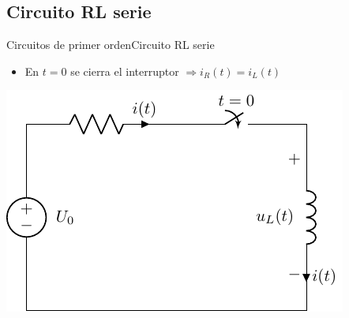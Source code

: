 \documentclass[aspectratio=169, xcolor={usenames,svgnames,dvipsnames}]{beamer}
\begin{document}
\subsection{Circuito RL serie}

\begin{frame}{Circuitos de primer orden}{Circuito RL serie}
\begin{itemize}
\item En \(t = 0\) se cierra el interruptor $\Rightarrow i_R(t)=i_L(t)$
\end{itemize}
\begin{center}
\includegraphics{../figs/transitorio_circuitoRL.pdf}
\end{center}
\end{frame}
\end{document}
